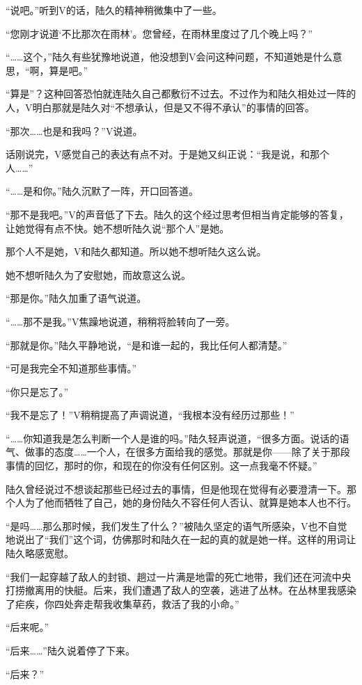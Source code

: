 “说吧。”听到V的话，陆久的精神稍微集中了一些。

“您刚才说道‘不比那次在雨林’。您曾经，在雨林里度过了几个晚上吗？”

“……这个，”陆久有些犹豫地说道，他没想到V会问这种问题，不知道她是什么意思，“啊，算是吧。”

“算是”？这种回答恐怕就连陆久自己都敷衍不过去。不过作为和陆久相处过一阵的人，V明白那就是陆久对“不想承认，但是又不得不承认”的事情的回答。

“那次……也是和我吗？”V说道。

话刚说完，V感觉自己的表达有点不对。于是她又纠正说：“我是说，和那个人……”

“……是和你。”陆久沉默了一阵，开口回答道。

“那不是我吧。”V的声音低了下去。陆久的这个经过思考但相当肯定能够的答复，让她觉得有点不快。她不想听陆久说“那个人”是她。

那个人不是她，V和陆久都知道。所以她不想听陆久这么说。

她不想听陆久为了安慰她，而故意这么说。

“那是你。”陆久加重了语气说道。

“……那不是我。”V焦躁地说道，稍稍将脸转向了一旁。

“那就是你。”陆久平静地说，“是和谁一起的，我比任何人都清楚。”

 “可是我完全不知道那些事情。”

“你只是忘了。”

“我不是忘了！”V稍稍提高了声调说道，“我根本没有经历过那些！”

“……你知道我是怎么判断一个人是谁的吗。”陆久轻声说道，“很多方面。说话的语气、做事的态度……一个人，在很多方面给我的感觉。那就是你——除了关于那段事情的回忆，那时的你，和现在的你没有任何区别。这一点我毫不怀疑。”

陆久曾经说过不想谈起那些已经过去的事情，但是他现在觉得有必要澄清一下。那个人为了他而牺牲了自己，她的身份陆久不容任何人否认、就算是她本人也不行。

“是吗……那么那时候，我们发生了什么？”被陆久坚定的语气所感染，V也不自觉地说出了“我们”这个词，仿佛那时和陆久在一起的真的就是她一样。这样的用词让陆久略感宽慰。

“我们一起穿越了敌人的封锁、趟过一片满是地雷的死亡地带，我们还在河流中央打捞撤离用的快艇。后来，我们遭遇了敌人的空袭，逃进了丛林。在丛林里我感染了疟疾，你四处奔走帮我收集草药，救活了我的小命。”

“后来呢。”

“后来……”陆久说着停了下来。

“后来？”

